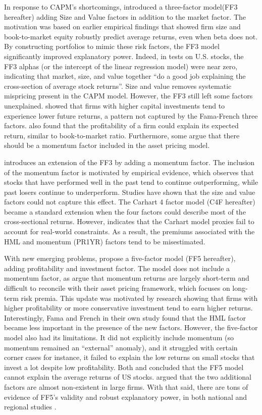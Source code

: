 In response to CAPM's shortcomings,  introduced a three-factor model(FF3 hereafter) adding Size and Value factors in addition to the market factor. The motivation was based on earlier empirical findings that showed firm size and book-to-market equity robustly predict average returns, even when beta does not. By constructing portfolios to mimic these risk factors, the FF3 model significantly improved explanatory power. Indeed, in tests on U.S. stocks, the FF3 alphas (or the intercept of the linear regression model) were near zero, indicating that market, size, and value together “do a good job explaining the cross-section of average stock returns”. Size and value removes systematic mispricing present in the CAPM model. However, the FF3 still left some factors unexplained.  showed that firms with higher capital investments tend to experience lower future returns, a pattern not captured by the Fama-French three factors.  also found that the profitability of a firm could explain its expected return, similar to book-to-market ratio. Furthermore, some argue that there should be a momentum factor included in the asset pricing model.

 introduces an extension of the FF3 by adding a momentum factor. The inclusion of the momentum factor is motivated by empirical evidence, which observes that stocks that have performed well in the past tend to continue outperforming, while past losers continue to underperform. Studies have shown that the size and value factors could not capture this effect. The Carhart 4 factor model (C4F hereafter) became a standard extension when the four factors could describe most of the cross-sectional returns. However,  indicates that the Carhart model proxies fail to account for real-world constraints. As a result, the premiums associated with the HML and momentum (PR1YR) factors tend to be misestimated.

With new emerging problems,  propose a five-factor model (FF5 hereafter), adding profitability and investment factor.  The model does not include a momentum factor, as  argue that momentum returns are largely short-term and difficult to reconcile with their asset pricing framework, which focuses on long-term risk premia. This update was motivated by research showing that firms with higher profitability or more conservative investment tend to earn higher returns. Interestingly, Fama and French in their own study found that the HML factor became less important in the presence of the new factors.  However, the five-factor model also had its limitations. It did not explicitly include momentum (so momentum remained an “external” anomaly), and it struggled with certain corner cases for instance, it failed to explain the low returns on small stocks that invest a lot despite low profitability. Both  and  concluded that the FF5 model cannot explain the average returns of US stocks.  argued that the two additional factors are almost non-existent in large firms. With that said, there are tons of evidence of FF5's validity and robust explanatory power, in both national and regional studies \cite{sohor_litreview_2024}.

